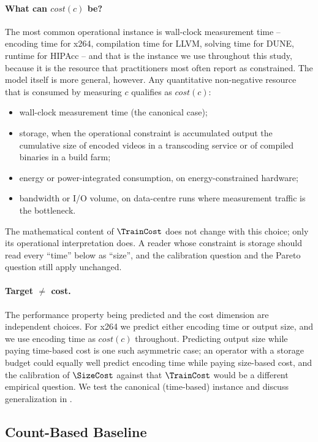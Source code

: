 \paragraph*{What can $\mathit{cost}(c)$ be?}
The most common operational instance is wall-clock measurement time --
encoding time for x264, compilation time for LLVM, solving time for DUNE,
runtime for HIPAcc -- and that is the instance we use throughout this
study, because it is the resource that practitioners most often report as
constrained. The model itself is more general, however. Any quantitative
non-negative resource that is consumed by measuring $c$ qualifies as
$\mathit{cost}(c)$:
\begin{itemize}
    \item wall-clock measurement time (the canonical case);
    \item storage, when the operational constraint is accumulated output
    \eg the cumulative size of encoded videos in a transcoding service or
    of compiled binaries in a build farm;
    \item energy or power-integrated consumption, on energy-constrained
    hardware;
    \item bandwidth or I/O volume, on data-centre runs where measurement
    traffic is the bottleneck.
\end{itemize}
The mathematical content of $\TrainCost$ does not change with this choice;
only its operational interpretation does. A reader whose constraint is
storage should read every ``time'' below as ``size'', and the calibration
question and the Pareto question still apply unchanged.

\paragraph*{Target $\neq$ cost.}
The performance property being predicted and the cost dimension are
independent choices. For x264 we predict either encoding time or output
size, and we use encoding time as $\mathit{cost}(c)$ throughout. Predicting
output size while paying time-based cost is one such asymmetric case; an
operator with a storage budget could equally well predict encoding time
while paying size-based cost, and the calibration of $\SizeCost$ against
that $\TrainCost$ would be a different empirical question. We test the
canonical (time-based) instance and discuss generalization in
.

\subsection{Count-Based Baseline}
\label{subsec:count-baseline}

